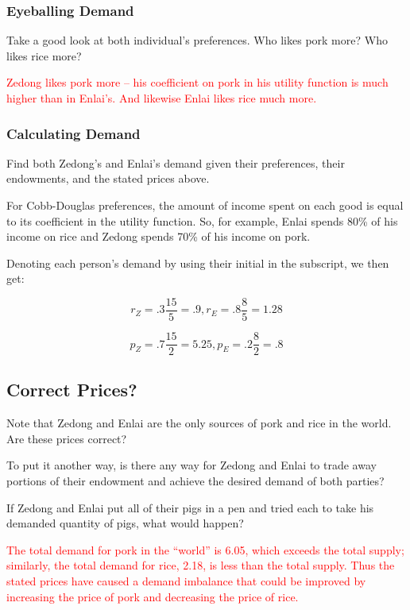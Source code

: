 \documentclass{article}
\newenvironment{solution}{\color{red}}{\color{black}}
\begin{document}
\subsubsection{Eyeballing Demand}

Take a good look at both individual's preferences. Who likes pork more? Who likes rice more?

\textcolor{red}{Zedong likes pork more -- his coefficient on pork in his utility function is much higher than in Enlai's. And likewise Enlai likes rice much more.}

\subsubsection{Calculating Demand}

Find both Zedong's and Enlai's demand given their preferences, their endowments, and the stated prices above.

\begin{solution}

For Cobb-Douglas preferences, the amount of income spent on each good is equal to its coefficient in the utility function. So, for example, Enlai spends 80\% of his income on rice and Zedong spends 70\% of his income on pork.

Denoting each person's demand by using their initial in the subscript, we then get:

\[ r_Z = .3 \frac{15}5 = .9, r_E = .8 \frac85 = 1.28 \]

\[ p_Z = .7 \frac{15}2 = 5.25, p_E = .2 \frac82 = .8 \]

\end{solution}

\subsection{Correct Prices?}

Note that Zedong and Enlai are the only sources of pork and rice in the world. Are these prices correct?

To put it another way, is there any way for Zedong and Enlai to trade away portions of their endowment and achieve the desired demand of both parties?

If Zedong and Enlai put all of their pigs in a pen and tried each to take his demanded quantity of pigs, what would happen?

\textcolor{red}{The total demand for pork in the ``world'' is 6.05, which exceeds the total supply; similarly, the total demand for rice, 2.18, is less than the total supply. Thus the stated prices have caused a demand imbalance that could be improved by increasing the price of pork and decreasing the price of rice.}
\end{document}
